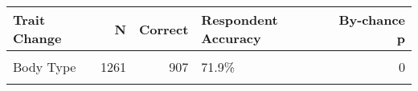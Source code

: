 \begin{table}[!h]

\caption{}
\centering
\fontsize{10}{12}\selectfont
\begin{tabular}[t]{lrrlr}
\toprule
Trait Change & N & Correct & Respondent Accuracy & By-chance p\\
\midrule
\cellcolor{gray!6}{Race or ethnicity} & \cellcolor{gray!6}{889} & \cellcolor{gray!6}{640} & \cellcolor{gray!6}{72.0\%} & \cellcolor{gray!6}{0}\\
Body Type & 1261 & 907 & 71.9\% & 0\\
\cellcolor{gray!6}{Gender} & \cellcolor{gray!6}{295} & \cellcolor{gray!6}{212} & \cellcolor{gray!6}{71.9\%} & \cellcolor{gray!6}{0}\\
\bottomrule
\end{tabular}
\end{table}
